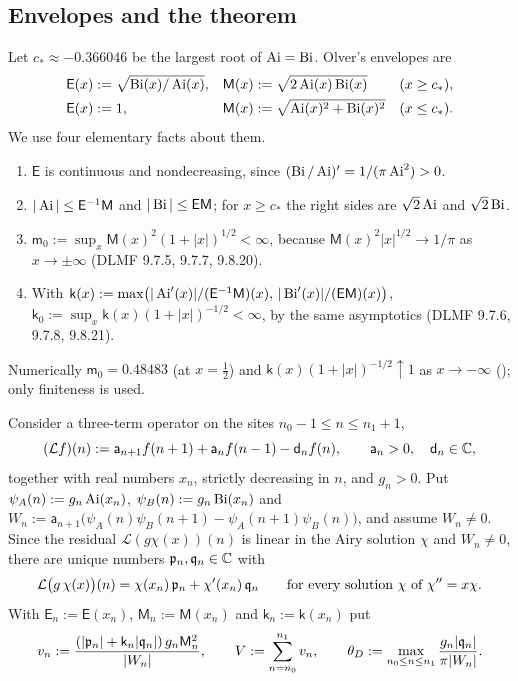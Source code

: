 \subsection{Envelopes and the theorem}

Let $c_*\approx-0.366046$ be the largest root of $\operatorname{Ai}=\operatorname{Bi}$. Olver's envelopes
\cite[Ch.~11, \S2]{Olver1974} are
\[
  \begin{aligned}
  \mathsf E(x)&:=\sqrt{\operatorname{Bi}(x)/\operatorname{Ai}(x)}, &\mathsf M(x)&:=\sqrt{2\operatorname{Ai}(x)\operatorname{Bi}(x)} &&(x\ge c_*),\\
  \mathsf E(x)&:=1, &\mathsf M(x)&:=\sqrt{\operatorname{Ai}(x)^2+\operatorname{Bi}(x)^2} &&(x\le c_*).
  \end{aligned}
\]
We use four elementary facts about them.
\begin{enumerate}
\item[(A1)] $\mathsf E$ is continuous and nondecreasing, since $(\operatorname{Bi}/\operatorname{Ai})'=1/(\pi\operatorname{Ai}^2)>0$.
\item[(A2)] $|\operatorname{Ai}|\le\mathsf E^{-1}\mathsf M$ and $|\operatorname{Bi}|\le\mathsf E\mathsf M$; for $x\ge c_*$ the
  right sides are $\sqrt2\operatorname{Ai}$ and $\sqrt2\operatorname{Bi}$.
\item[(A3)] $\mathsf m_0:=\sup_x\mathsf M(x)^2(1+|x|)^{1/2}<\infty$, because
  $\mathsf M(x)^2|x|^{1/2}\to1/\pi$ as $x\to\pm\infty$ (DLMF 9.7.5, 9.7.7, 9.8.20).
\item[(A4)] With $\mathsf k(x):=\max\bigl(|\operatorname{Ai}'(x)|/(\mathsf E^{-1}\mathsf M)(x),\,|\operatorname{Bi}'(x)|/(\mathsf E\mathsf M)(x)\bigr)$,
  $\mathsf k_0:=\sup_x\mathsf k(x)(1+|x|)^{-1/2}<\infty$, by the same asymptotics (DLMF 9.7.6,
  9.7.8, 9.8.21).
\end{enumerate}
Numerically $\mathsf m_0=0.48483$ (at $x=\frac12$) and $\mathsf k(x)(1+|x|)^{-1/2}\uparrow1$ as
$x\to-\infty$ (); only finiteness is used.

Consider a three-term operator on the sites $n_0-1\le n\le n_1+1$,
\begin{equation}\label{eq:Lgeneral}
  (\mathcal Lf)(n):=\mathsf a_{n+1}f(n+1)+\mathsf a_nf(n-1)-\mathsf d_nf(n),\qquad
  \mathsf a_n>0,\quad \mathsf d_n\in\mathbb{C},
\end{equation}
together with real numbers $x_n$, strictly decreasing in $n$, and $g_n>0$. Put
$\psi_A(n):=g_n\operatorname{Ai}(x_n)$, $\psi_B(n):=g_n\operatorname{Bi}(x_n)$ and
$W_n:=\mathsf a_{n+1}\bigl(\psi_A(n)\psi_B(n+1)-\psi_A(n+1)\psi_B(n)\bigr)$, and assume
$W_n\neq0$. Since the residual $\mathcal L(g\chi(x))(n)$ is linear in the Airy solution
$\chi$ and $W_n\ne0$, there are unique numbers $\mathfrak{p}_n,\mathfrak{q}_n\in\mathbb{C}$ with
\begin{equation}\label{eq:residual}
  \mathcal L\bigl(g\,\chi(x)\bigr)(n)=\chi(x_n)\,\mathfrak{p}_n+\chi'(x_n)\,\mathfrak{q}_n
  \qquad\text{for every solution $\chi$ of }\chi''=x\chi .
\end{equation}
With $\mathsf E_n:=\mathsf E(x_n)$, $\mathsf M_n:=\mathsf M(x_n)$ and $\mathsf k_n:=\mathsf k(x_n)$ put
\[
  v_n:=\frac{(|\mathfrak{p}_n|+\mathsf k_n|\mathfrak{q}_n|)\,g_n\mathsf M_n^2}{|W_n|},\qquad
  V:=\sum_{n=n_0}^{n_1}v_n,\qquad
  \theta_D:=\max_{n_0\le n\le n_1}\frac{g_n|\mathfrak{q}_n|}{\pi|W_n|}.
\]

